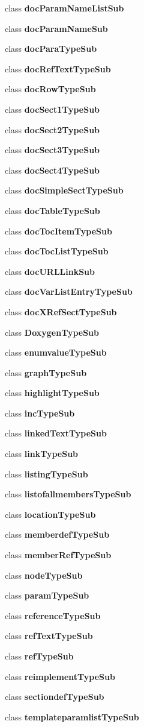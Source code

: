 \begin{DoxyCompactItemize}
\item 
class {\bf doc\+Param\+Name\+List\+Sub}
\item 
class {\bf doc\+Param\+Name\+Sub}
\item 
class {\bf doc\+Para\+Type\+Sub}
\item 
class {\bf doc\+Ref\+Text\+Type\+Sub}
\item 
class {\bf doc\+Row\+Type\+Sub}
\item 
class {\bf doc\+Sect1\+Type\+Sub}
\item 
class {\bf doc\+Sect2\+Type\+Sub}
\item 
class {\bf doc\+Sect3\+Type\+Sub}
\item 
class {\bf doc\+Sect4\+Type\+Sub}
\item 
class {\bf doc\+Simple\+Sect\+Type\+Sub}
\item 
class {\bf doc\+Table\+Type\+Sub}
\item 
class {\bf doc\+Toc\+Item\+Type\+Sub}
\item 
class {\bf doc\+Toc\+List\+Type\+Sub}
\item 
class {\bf doc\+U\+R\+L\+Link\+Sub}
\item 
class {\bf doc\+Var\+List\+Entry\+Type\+Sub}
\item 
class {\bf doc\+X\+Ref\+Sect\+Type\+Sub}
\item 
class {\bf Doxygen\+Type\+Sub}
\item 
class {\bf enumvalue\+Type\+Sub}
\item 
class {\bf graph\+Type\+Sub}
\item 
class {\bf highlight\+Type\+Sub}
\item 
class {\bf inc\+Type\+Sub}
\item 
class {\bf linked\+Text\+Type\+Sub}
\item 
class {\bf link\+Type\+Sub}
\item 
class {\bf listing\+Type\+Sub}
\item 
class {\bf listofallmembers\+Type\+Sub}
\item 
class {\bf location\+Type\+Sub}
\item 
class {\bf memberdef\+Type\+Sub}
\item 
class {\bf member\+Ref\+Type\+Sub}
\item 
class {\bf node\+Type\+Sub}
\item 
class {\bf param\+Type\+Sub}
\item 
class {\bf reference\+Type\+Sub}
\item 
class {\bf ref\+Text\+Type\+Sub}
\item 
class {\bf ref\+Type\+Sub}
\item 
class {\bf reimplement\+Type\+Sub}
\item 
class {\bf sectiondef\+Type\+Sub}
\item 
class {\bf templateparamlist\+Type\+Sub}
\end{DoxyCompactItemize}
